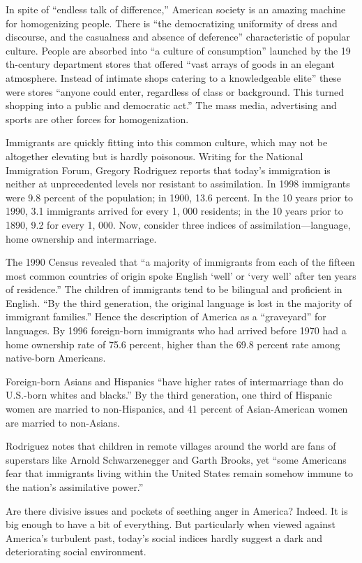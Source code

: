 In spite of  ``endless talk of difference,'' American society is an
amazing machine for homogenizing people. There is ``the democratizing
uniformity of dress and discourse, and the casualness and absence of
deference'' characteristic of popular culture. People are absorbed into
``a culture of consumption'' launched by the 19 th-century department
stores that offered ``vast arrays of goods in an elegant atmosphere.
Instead of intimate shops catering to a knowledgeable elite'' these were
stores ``anyone could enter, regardless of class or background. This
turned shopping into a public and democratic act.'' The mass media,
advertising and sports are other forces for homogenization.

Immigrants are quickly fitting into this common culture, which may not
be altogether elevating but is hardly poisonous. Writing for the
National Immigration Forum, Gregory Rodriguez reports that today's
immigration is neither at unprecedented levels nor resistant to
assimilation. In 1998 immigrants were 9.8 percent of the population; in
1900, 13.6 percent. In the 10 years prior to 1990, 3.1 immigrants
arrived for every 1, 000 residents; in the 10 years prior to 1890, 9.2
for every 1, 000. Now, consider three indices of assimilation---language,
home ownership and intermarriage.

The 1990 Census revealed that ``a majority of immigrants from each of
the fifteen most common countries of origin spoke English `well' or
`very well' after ten years of residence.'' The children of immigrants
tend to be bilingual and proficient in English. ``By the third
generation, the original language is lost in the majority of immigrant
families.'' Hence the description of America as a ``graveyard'' for
languages. By 1996 foreign-born immigrants who had arrived before 1970
had a home ownership rate of 75.6 percent, higher than the 69.8 percent
rate among native-born Americans.

Foreign-born Asians and Hispanics ``have higher rates of intermarriage
than do U.S.-born whites and blacks.'' By the third generation, one
third of Hispanic women are married to non-Hispanics, and 41 percent of
Asian-American women are married to non-Asians.

Rodriguez notes that children in remote villages around the world are
fans of superstars like Arnold Schwarzenegger and Garth Brooks, yet
``some Americans fear that immigrants living within the United States
remain somehow immune to the nation's assimilative power.''

Are there divisive issues and pockets of seething anger in America?
Indeed. It is big enough to have a bit of everything. But particularly
when viewed against America's turbulent past, today's social indices
hardly suggest a dark and deteriorating social environment.



